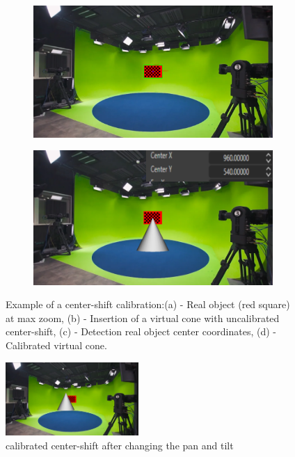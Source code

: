 \begin{figure}[h]
    \begin{subfigure}[b]{0.45\textwidth}
        \includegraphics[width=\textwidth]{Images/04calibration/3.png}
        \caption{}
        \label{fig:c}
    \end{subfigure}
    \hfill
    \begin{subfigure}[b]{0.45\textwidth}
        \includegraphics[width=\textwidth]{Images/04calibration/4.png}
        \caption{}
        \label{fig:d}
    \end{subfigure}

    \caption{Example of a center-shift calibration:(a) - Real object (red square) at max zoom, (b) - Insertion of a virtual cone with uncalibrated center-shift, (c) - Detection real object center coordinates, (d) - Calibrated virtual cone.}
    \label{fig:main}
\end{figure}

\begin{figure}[h]
    \centering
    \includegraphics[width=0.45\textwidth]{Images/04calibration/5.png}
    \caption{calibrated center-shift after changing the pan and tilt}
    \label{fig:f}
\end{figure}

